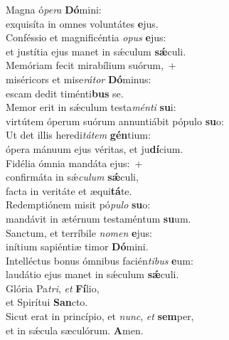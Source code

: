 \evenverse Magna ó\textit{pe}\textit{ra} \textbf{Dó}mini:~\*\\
\evenverse exquisíta in omnes voluntátes \textbf{e}jus.\\
\oddverse Conféssio et magnificéntia \textit{o}\textit{pus} \textbf{e}jus:~\*\\
\oddverse et justítia ejus manet in sǽculum \textbf{sǽ}culi.\\
\evenverse Memóriam fecit mirabílium suórum,~+\\
\evenverse  miséricors et mise\textit{rá}\textit{tor} \textbf{Dó}minus:~\*\\
\evenverse escam dedit timénti\textbf{bus} se.\\
\oddverse Memor erit in sǽculum testa\textit{mén}\textit{ti} \textbf{su}i:~\*\\
\oddverse virtútem óperum suórum annuntiábit pópulo \textbf{su}o:\\
\evenverse Ut det illis heredi\textit{tá}\textit{tem} \textbf{gén}tium:~\*\\
\evenverse ópera mánuum ejus véritas, et ju\textbf{dí}cium.\\
\oddverse Fidélia ómnia mandáta ejus:~+\\
\oddverse  confirmáta in sǽ\textit{cu}\textit{lum} \textbf{sǽ}culi,~\*\\
\oddverse facta in veritáte et æqui\textbf{tá}te.\\
\evenverse Redemptiónem misit pó\textit{pu}\textit{lo} \textbf{su}o:~\*\\
\evenverse mandávit in ætérnum testaméntum \textbf{su}um.\\
\oddverse Sanctum, et terríbile \textit{no}\textit{men} \textbf{e}jus:~\*\\
\oddverse inítium sapiéntiæ timor \textbf{Dó}mini.\\
\evenverse Intelléctus bonus ómnibus facién\textit{ti}\textit{bus} \textbf{e}um:~\*\\
\evenverse laudátio ejus manet in sǽculum \textbf{sǽ}culi.\\
\oddverse Glória Pa\textit{tri}, \textit{et} \textbf{Fí}lio,~\*\\
\oddverse et Spirítui \textbf{San}cto.\\
\evenverse Sicut erat in princípio, et \textit{nunc}, \textit{et} \textbf{sem}per,~\*\\
\evenverse et in sǽcula sæculórum. \textbf{A}men.\\

